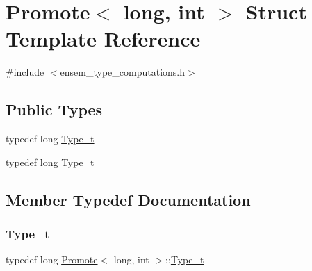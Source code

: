 \hypertarget{structPromote_3_01long_00_01int_01_4}{}\section{Promote$<$ long, int $>$ Struct Template Reference}
\label{structPromote_3_01long_00_01int_01_4}


{\ttfamily \#include $<$ensem\+\_\+type\+\_\+computations.\+h$>$}

\subsection*{Public Types}
\begin{DoxyCompactItemize}
\item 
typedef long \mbox{\hyperlink{structPromote_3_01long_00_01int_01_4_ab0ceeb6c9abec4d97d5caab44831ba92}{Type\+\_\+t}}
\item 
typedef long \mbox{\hyperlink{structPromote_3_01long_00_01int_01_4_ab0ceeb6c9abec4d97d5caab44831ba92}{Type\+\_\+t}}
\end{DoxyCompactItemize}


\subsection{Member Typedef Documentation}
\mbox{\label{structPromote_3_01long_00_01int_01_4_ab0ceeb6c9abec4d97d5caab44831ba92}} 
\subsubsection{\texorpdfstring{Type\_t}{Type\_t}\hspace{0.1cm}{\footnotesize\ttfamily [1/2]}}
{\footnotesize\ttfamily typedef long \mbox{\hyperlink{structPromote}{Promote}}$<$ long, int $>$\+::\mbox{\hyperlink{structPromote_3_01long_00_01int_01_4_ab0ceeb6c9abec4d97d5caab44831ba92}{Type\+\_\+t}}}

\mbox{\label{structPromote_3_01long_00_01int_01_4_ab0ceeb6c9abec4d97d5caab44831ba92}} 
